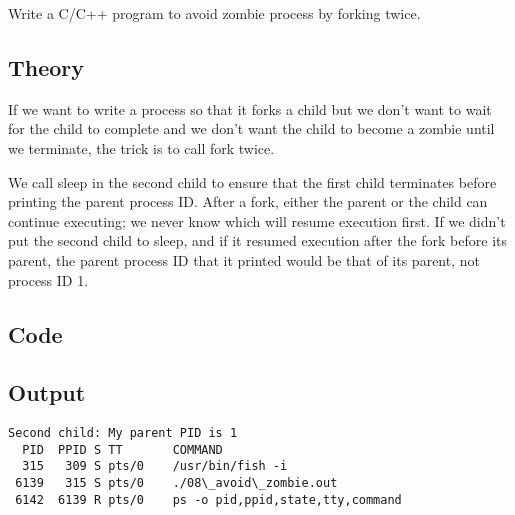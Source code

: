 Write a C/C++ program to avoid zombie process by forking twice.

\subsection{Theory}

If we want to write a process so that it forks a child but we don't want to wait for the child to complete and we don't want the child to become a zombie until we terminate, the trick is to call fork twice.

We call sleep in the second child to ensure that the first child terminates before printing the parent process ID. After a fork, either the parent or the child can continue executing; we never know which will resume execution first. If we didn't put the second child to sleep, and if it resumed execution after the fork before its parent, the parent process ID that it printed would be that of its parent, not process ID 1.

\subsection{Code}



\subsection{Output}

\begin{lstlisting}[style=shell-output]
Second child: My parent PID is 1
  PID  PPID S TT       COMMAND
  315   309 S pts/0    /usr/bin/fish -i
 6139   315 S pts/0    ./08\_avoid\_zombie.out
 6142  6139 R pts/0    ps -o pid,ppid,state,tty,command
\end{lstlisting}
